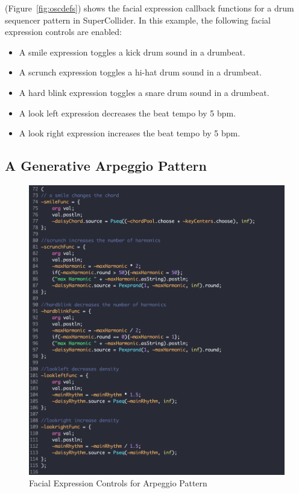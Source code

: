(Figure~\ref{fig:oscdefs}) shows the facial expression callback functions for a drum sequencer pattern in SuperCollider. In this example, the following facial expression controls are enabled:
\begin{itemize}
\item A smile expression toggles a kick drum sound in a drumbeat. 
\item A scrunch expression toggles a hi-hat drum sound in a drumbeat. 
\item A hard blink expression toggles a snare drum sound in a drumbeat. 
\item A look left expression decreases the beat tempo by 5 bpm. 
\item A look right expression increases the beat tempo by 5 bpm.
\end{itemize}

\pagebreak

\subsection{A Generative Arpeggio Pattern}
\begin{figure}[htbp]
	\centering
		\includegraphics[width=1\columnwidth]{daisypat.png}
	\caption{Facial Expression Controls for Arpeggio Pattern}
	\label{fig:daisypat}
\end{figure}

